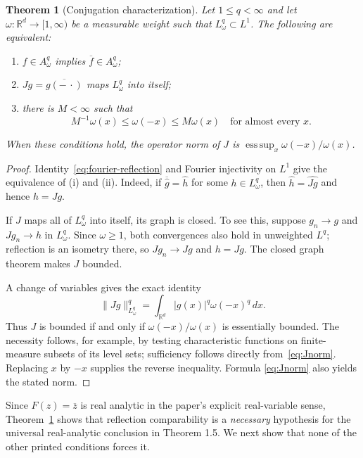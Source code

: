 \documentclass[11pt]{article}
\newtheorem{theorem}{Theorem}
\newcommand{\R}{\mathbb R}
\begin{document}
\begin{theorem}[Conjugation characterization]\label{thm:characterization}
Let $1\le q<\infty$ and let $\omega:\R^d\to[1,\infty)$ be a measurable
weight such that $L^q_\omega\subset L^1$.  The following are equivalent:
\begin{enumerate}[label=\textup{(\roman*)}]
 \item $f\in A^q_\omega$ implies $\overline f\in A^q_\omega$;
 \item $Jg=\overline{g(-\,\cdot)}$ maps $L^q_\omega$ into itself;
 \item there is $M<\infty$ such that
 \[
   M^{-1}\omega(x)\le\omega(-x)\le M\omega(x)
   \quad\text{for almost every }x.
 \]
\end{enumerate}
When these conditions hold, the operator norm of $J$ is
$\operatorname*{ess\,sup}_x\omega(-x)/\omega(x)$.
\end{theorem}

\begin{proof}
Identity~\eqref{eq:fourier-reflection} and Fourier injectivity on $L^1$
give the equivalence of (i) and (ii).  Indeed, if
$\overline{\widehat g}=\widehat h$ for some $h\in L^q_\omega$, then
$\widehat h=\widehat{Jg}$ and hence $h=Jg$.

If $J$ maps all of $L^q_\omega$ into itself, its graph is closed.  To see
this, suppose $g_n\to g$ and $Jg_n\to h$ in $L^q_\omega$.  Since
$\omega\ge1$, both convergences also hold in unweighted $L^q$; reflection
is an isometry there, so $Jg_n\to Jg$ and $h=Jg$.  The closed graph theorem
makes $J$ bounded.

A change of variables gives the exact identity
\begin{equation}\label{eq:Jnorm}
 \|Jg\|_{L^q_\omega}^q
 =\int_{\R^d}|g(x)|^q\omega(-x)^q\,dx.
\end{equation}
Thus $J$ is bounded if and only if
$\omega(-x)/\omega(x)$ is essentially bounded.  The necessity follows,
for example, by testing characteristic functions on finite-measure subsets
of its level sets; sufficiency follows directly from~\eqref{eq:Jnorm}.
Replacing $x$ by $-x$ supplies the reverse inequality.  Formula
\eqref{eq:Jnorm} also yields the stated norm.
\end{proof}

Since $F(z)=\overline z$ is real analytic in the paper's explicit
real-variable sense, Theorem~\ref{thm:characterization} shows that
reflection comparability is a \emph{necessary} hypothesis for the universal
real-analytic conclusion in Theorem 1.5.  We next show that none of the
other printed conditions forces it.
\end{document}
